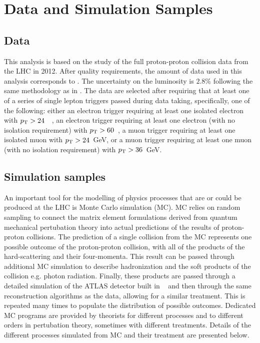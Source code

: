 \section{Data and Simulation Samples}
\subsection{Data}
\label{sec:subsection_data}



This analysis is based on the study of the full proton-proton collision
data from the LHC in 2012. After quality requirements, the amount 
of data used in this analysis corresponds to \lumi.
The uncertainty on the luminosity is $2.8\%$ 
following the same methodology as in \cite{Aad:2013ucp}.
The data are selected after requiring that at least one
of a series of single lepton triggers passed during data taking, 
specifically, one of the following:
either an electron trigger 
requiring at least one isolated
electron with $p_{\mathrm{T}}>24$~\GeV~, an electron trigger requiring
at least one electron 
(with no isolation requirement) with $p_{\mathrm{T}}>60$~\GeV, a muon 
trigger requiring at least one isolated muon with $p_{\mathrm{T}}>24$~GeV,
or a muon trigger requiring at least one muon 
(with no isolation requirement) with $p_{\mathrm{T}}>36$~GeV.


\subsection{Simulation samples}

An important tool for the modelling of physics processes
that are or could be produced at the LHC is Monte Carlo simulation (MC).
MC relies on random sampling to connect the matrix element formulations
derived from quantum mechanical pertubation theory into 
actual predictions of the results of proton-proton collisions.
The prediction of a single collision from the MC represents
one possible outcome of the proton-proton collision, with all of the 
products of the hard-scattering and their four-momenta.
This result can be passed through additional MC simulation to describe
hadronization and the soft products of the collision e.g. photon radiation.
Finally, these products are passed through a detailed 
simulation of the ATLAS detector built in \geant~\cite{Agostinelli:2002hh}
and then through the same reconstruction algorithms
as the data, allowing for a similar treatment.
This is repeated many times to populate the distribution of possible
outcomes. Dedicated MC programs are provided by theorists for 
different processes and to different orders in pertubation theory,
sometimes with different treatments.
Details of the different processes simulated from MC and their
treatment are presented below.




